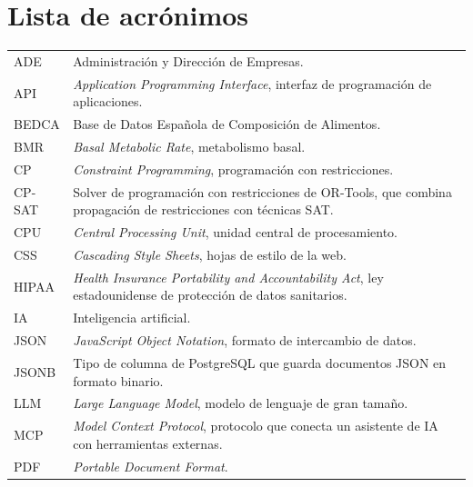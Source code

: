 %
%
%
%

\ifpdf
\fi
{}
\chapter*{Lista de acrónimos}

\renewcommand{\arraystretch}{1.1}
\begin{tabular}{@{}p{2.3cm}p{11.4cm}@{}}
ADE & Administración y Dirección de Empresas. \\
API & \textit{Application Programming Interface}, interfaz de programación de aplicaciones. \\
BEDCA & Base de Datos Española de Composición de Alimentos. \\
BMR & \textit{Basal Metabolic Rate}, metabolismo basal. \\
CP & \textit{Constraint Programming}, programación con restricciones. \\
CP-SAT & Solver de programación con restricciones de OR-Tools, que combina propagación de restricciones con técnicas SAT. \\
CPU & \textit{Central Processing Unit}, unidad central de procesamiento. \\
CSS & \textit{Cascading Style Sheets}, hojas de estilo de la web. \\
HIPAA & \textit{Health Insurance Portability and Accountability Act}, ley estadounidense de protección de datos sanitarios. \\
IA & Inteligencia artificial. \\
JSON & \textit{JavaScript Object Notation}, formato de intercambio de datos. \\
JSONB & Tipo de columna de PostgreSQL que guarda documentos JSON en formato binario. \\
LLM & \textit{Large Language Model}, modelo de lenguaje de gran tamaño. \\
MCP & \textit{Model Context Protocol}, protocolo que conecta un asistente de IA con herramientas externas. \\
PDF & \textit{Portable Document Format}. \\

\end{tabular}
